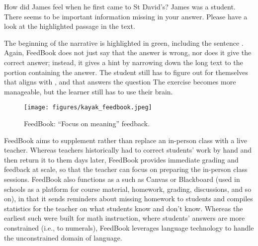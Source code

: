 \ea \label{james} How did James feel when he first came to St David's?
    \ea \label{student} James was a student.
    \ex \label{missing} There seems to be important information missing in your answer. Please have a look at the highlighted passage in the text.
\z
\z

The beginning of the narrative is highlighted in green, including the sentence .  Again, FeedBook does not just say that the answer is wrong, nor does it give the correct answer; instead, it gives a hint by narrowing down the long text to the portion containing the answer.  The student still has to figure out for themselves that  aligns with , and that  answers the question   The exercise becomes more manageable, but the learner still has to use their brain.

\begin{figure}
\texttt{[image: figures/kayak\_feedbook.jpeg]}
\caption{FeedBook: ``Focus on meaning'' feedback.}
\label{fig:feedbook-focus-on-meaning}
\end{figure}


FeedBook aims to supplement rather than replace an in-person class with a live teacher.  Whereas teachers historically had to correct students' work by hand and then return it to them days later, FeedBook provides immediate grading and feedback at scale, so that the teacher can focus on preparing the in-person class sessions.  FeedBook also functions as a  such as Canvas or Blackboard (used in schools as a platform for course material, homework, grading, discussions, and so on), in that it sends reminders about missing homework to students and compiles statistics for the teacher on what students know and don't know.  Whereas the earliest such  were built for math instruction, where students' answers are more constrained (i.e., to numerals), FeedBook leverages language technology to handle the unconstrained domain of language.  




